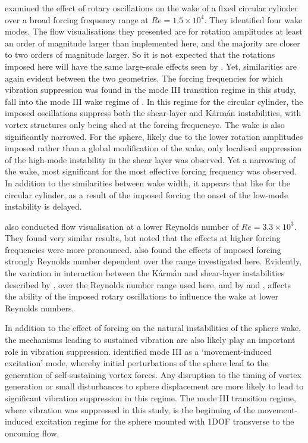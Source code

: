 \documentclass[3p]{elsarticle}
\begin{document}
\citet{Tokumaru1991} examined the effect of rotary oscillations on the wake of a fixed circular cylinder over a broad forcing frequency range at $Re=1.5\times10^4$. 
They identified four wake modes. 
The flow visualisations they presented are for rotation amplitudes at least an order of magnitude larger than implemented here, and the majority are closer to two orders of magnitude larger. 
So it is not expected that the rotations imposed here will have the same large-scale effects seen by \citet{Tokumaru1991}. 
Yet, similarities are again evident between the two geometries. 
The forcing frequencies for which vibration suppression was found in the mode III transition regime in this study, fall into the mode III wake regime of \citet{Tokumaru1991}. 
In this regime for the circular cylinder, the imposed oscillations suppress both the shear-layer and K\'arm\'an instabilities, with vortex structures only being shed at the forcing frequencye. 
The wake is also significantly narrowed. 
For the sphere, likely due to the lower rotation amplitudes imposed rather than a global modification of the wake, only localised suppression of the high-mode instability in the shear layer was observed. 
Yet a narrowing of the wake, most significant for the most effective forcing frequency was observed. 
In addition to the similarities between wake width, it appears that like for the circular cylinder, as a result of the imposed forcing the onset of the low-mode instability is delayed. 

\citet{Tokumaru1991} also conducted flow visualisation at a lower Reynolds number of $Re=3.3\times10^3$. 
They found very similar results, but noted that the effects at higher forcing frequencies were more pronounced. 
\citet{Shiels2001} also found the effects of imposed forcing strongly Reynolds number dependent over the range investigated here. 
Evidently, the variation in interaction between the K\'arm\'an and shear-layer instabilities described by \citet{Thompson2005}, over the Reynolds number range used here, and by \citet{Tokumaru1991} and \citet{Shiels2001}, affects the ability of the imposed rotary oscillations to influence the wake at lower Reynolds numbers. 

In addition to the effect of forcing on the natural instabilities of the sphere wake, the mechanisms leading to sustained vibration are also likely play an important role in vibration suppression. 
\citet{Govardhan2005} identified mode III as a `movement-induced excitation' mode, whereby initial perturbations of the sphere lead to the generation of self-sustaining vortex forces. 
Any disruption to the timing of vortex generation or small disturbances to sphere displacement are more likely to lead to significant vibration suppression in this regime. 
The mode III transition regime, where vibration was suppressed in this study, is the beginning of the movement-induced excitation regime for the sphere mounted with 1DOF transverse to the oncoming flow.
\end{document}
